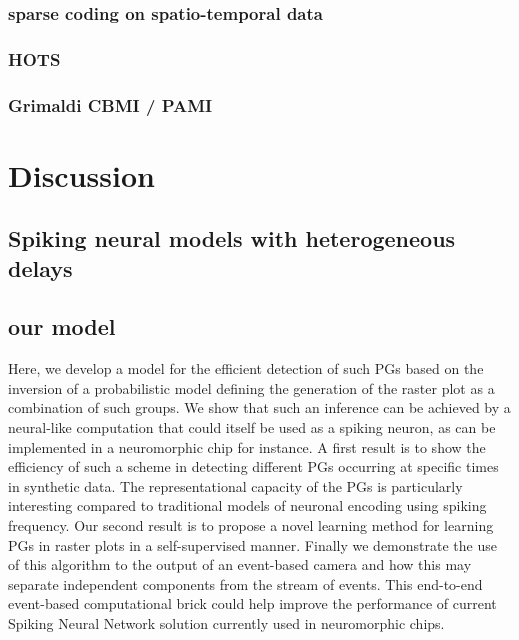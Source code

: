 \documentclass[brainsci, %
               review,submit,pdftex,moreauthors]{Definitions/mdpi}
\begin{document}
\subsubsection{sparse coding on spatio-temporal data}\label{sparse-coding-on-spatio-temporal-data}
\subsubsection{HOTS}\label{hots}
\subsubsection{Grimaldi CBMI / PAMI}\label{grimaldi-cbmi-pami}
\section{Discussion}\label{discussion}
\subsection{Spiking neural models with heterogeneous delays}
\subsection{our model}\label{our-model}
Here, we develop a model for the efficient detection of such PGs based on the inversion of a probabilistic model defining the generation of the raster plot as a combination of such groups. We show that such an inference can be achieved by a neural-like computation that could itself be used as a spiking neuron, as can be implemented in a neuromorphic chip for instance. A first result is to show the efficiency of such a scheme in detecting different PGs occurring at specific times in synthetic data. The representational capacity of the PGs is particularly interesting compared to traditional models of neuronal encoding using spiking frequency. Our second result is to propose a novel learning method for learning PGs in raster plots in a self-supervised manner. Finally we demonstrate the use of this algorithm to the output of an event-based camera and how this may separate independent components from the stream of events. This end-to-end event-based computational brick could help improve the performance of current Spiking Neural Network solution currently used in neuromorphic chips.
\end{document}
